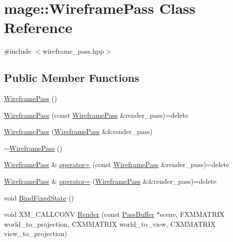 \hypertarget{classmage_1_1_wireframe_pass}{}\section{mage\+:\+:Wireframe\+Pass Class Reference}
\label{classmage_1_1_wireframe_pass}


{\ttfamily \#include $<$wireframe\+\_\+pass.\+hpp$>$}

\subsection*{Public Member Functions}
\begin{DoxyCompactItemize}
\item 
\hyperlink{classmage_1_1_wireframe_pass_a7323b3caca5d06a068a89c0333651f04}{Wireframe\+Pass} ()
\item 
\hyperlink{classmage_1_1_wireframe_pass_a3e070108925c2ef3b4feaa29dbf605f2}{Wireframe\+Pass} (const \hyperlink{classmage_1_1_wireframe_pass}{Wireframe\+Pass} \&render\+\_\+pass)=delete
\item 
\hyperlink{classmage_1_1_wireframe_pass_a08631bc9b341bed85b1b14b99affb1f0}{Wireframe\+Pass} (\hyperlink{classmage_1_1_wireframe_pass}{Wireframe\+Pass} \&\&render\+\_\+pass)
\item 
\hyperlink{classmage_1_1_wireframe_pass_a186e4dd37ac17382872180385ec4dca1}{$\sim$\+Wireframe\+Pass} ()
\item 
\hyperlink{classmage_1_1_wireframe_pass}{Wireframe\+Pass} \& \hyperlink{classmage_1_1_wireframe_pass_a57da0b468c68c8653ebc639923b111ba}{operator=} (const \hyperlink{classmage_1_1_wireframe_pass}{Wireframe\+Pass} \&render\+\_\+pass)=delete
\item 
\hyperlink{classmage_1_1_wireframe_pass}{Wireframe\+Pass} \& \hyperlink{classmage_1_1_wireframe_pass_abd90640d63b9ce0c44b87de87d06910c}{operator=} (\hyperlink{classmage_1_1_wireframe_pass}{Wireframe\+Pass} \&\&render\+\_\+pass)=delete
\item 
void \hyperlink{classmage_1_1_wireframe_pass_abf99690ae099ed0ba0ca35c5d87ac0ef}{Bind\+Fixed\+State} ()
\item 
void X\+M\+\_\+\+C\+A\+L\+L\+C\+O\+NV \hyperlink{classmage_1_1_wireframe_pass_af5460b2becc0bb84954e33969cb50d0c}{Render} (const \hyperlink{structmage_1_1_pass_buffer}{Pass\+Buffer} $\ast$scene, F\+X\+M\+M\+A\+T\+R\+IX world\+\_\+to\+\_\+projection, C\+X\+M\+M\+A\+T\+R\+IX world\+\_\+to\+\_\+view, C\+X\+M\+M\+A\+T\+R\+IX view\+\_\+to\+\_\+projection)
\end{DoxyCompactItemize}
